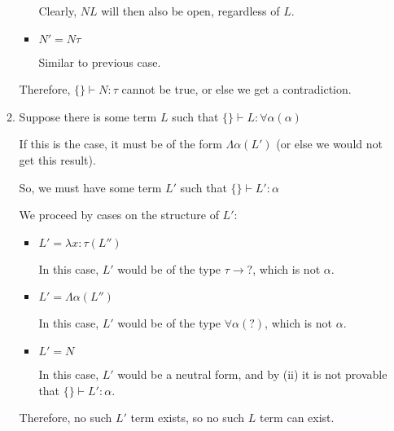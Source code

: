 \begin{enumerate}[label=(\alph*)]
\begin{enumerate}[label=(\roman*)]
\begin{itemize}
          Clearly, $N L$ will then also be open, regardless of $L$.

        \item
          $N' = N \tau$

          Similar to previous case.
      \end{itemize}

      Therefore, $\{\} \vdash N : \tau$ cannot be true, or else we get a contradiction.

    \item
      Suppose there is some term $L$ such that $\{\} \vdash L : \forall \alpha(\alpha)$

      If this is the case, it must be of the form $\Lambda \alpha (L')$ (or else we would not get this result).

      So, we must have some term $L'$ such that $\{\} \vdash L' : \alpha$

      We proceed by cases on the structure of $L'$:

      \begin{itemize}
        \item
          $L' = \lambda x : \tau (L'')$

          In this case, $L'$ would be of the type $\tau \rightarrow ?$, which is not $\alpha$.

        \item
          $L' = \Lambda \alpha (L'')$

          In this case, $L'$ would be of the type $\forall \alpha(?)$, which is not $\alpha$.

        \item
          $L' = N$

          In this case, $L'$ would be a neutral form, and by (ii) it is not provable that $\{\} \vdash L' : \alpha$.
      \end{itemize}

      Therefore, no such $L'$ term exists, so no such $L$ term can exist.
      
  \end{enumerate}

        
\end{enumerate}

